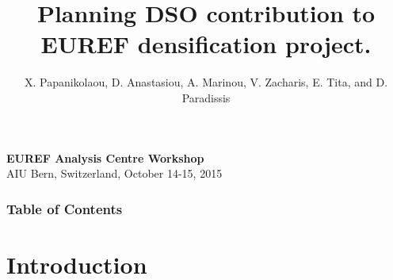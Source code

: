 \documentclass{beamer}
\title{Planning DSO contribution to EUREF densification project.}
\date{}
\author{X. Papanikolaou, D. Anastasiou, A. Marinou, V. Zacharis, E. Tita, and D. Paradissis}
\institute{National Technical University of Athens\\Dionysos Satellite Observatory\\\url{http://dionysos.survey.ntua.gr}}
\begin{document}
\begin{frame}[plain]
\maketitle
\begin{block}{}
    \begin{center}
      \textbf{EUREF Analysis Centre Workshop}\\
    AIU Bern, Switzerland, October 14-15, 2015 \\
    \end{center}
\end{block}
\end{frame}

\begin{frame}
    \frametitle{Table of Contents}
    \tableofcontents
\end{frame}

\section{Introduction}
\end{document}
